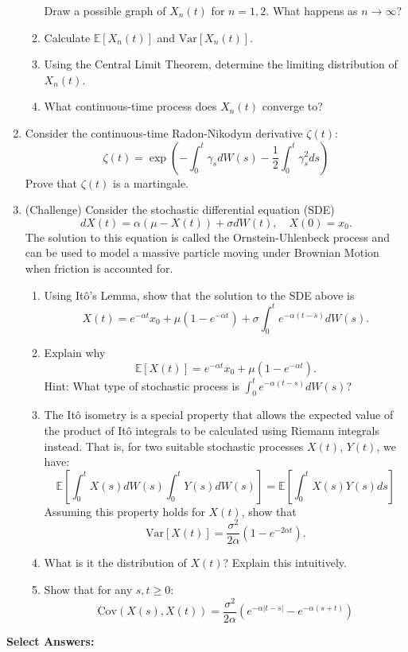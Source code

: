 \documentclass[11pt]{article}
\newcommand{\E}{\mathbb{E}}
\begin{document}
\begin{enumerate}
\begin{enumerate}
				Draw a possible graph of $X_{n}(t)$ for $n=1,2$. What happens as $n\to\infty$?
				\item Calculate $\E[X_{n}(t)]$ and $\text{Var}[X_{n}(t)]$.
				\item Using the Central Limit Theorem, determine the limiting distribution of $X_{n}(t)$.
				\item What continuous-time process does $X_{n}(t)$ converge to?
			\end{enumerate}
		\item Consider the continuous-time Radon-Nikodym derivative $\zeta(t)$:
		\[	\zeta(t) = \exp\left(-\int_{0}^{t}\gamma_{s}dW(s) -\frac{1}{2} \int_{0}^{t}\gamma_{s}^{2}ds\right)
			\]
		Prove that $\zeta(t)$ is a martingale.
		\item (Challenge) Consider the stochastic differential equation (SDE)
		\[	dX(t) = \alpha(\mu - X(t))+ \sigma dW(t),\quad X(0) = x_{0}.
		\]
		The solution to this equation is called the Ornstein-Uhlenbeck process and can be used to model a massive particle moving under Brownian Motion when friction is accounted for.
		\begin{enumerate}
			\item Using It\^{o}'s Lemma, show that the solution to the SDE above 
			is 
			\[	X(t) = e^{-\alpha t}x_{0} + \mu(1 - e^{-\alpha t}) + \sigma\int_{0}^{t}e^{-\alpha(t - s)}dW(s).
			\]
			\item Explain why 
			\[	\E[X(t)] = e^{-\alpha t}x_{0} + \mu(1 - e^{-\alpha t}).
				\]
			Hint: What type of stochastic process is $\int_{0}^{t}e^{-\alpha(t - s)}dW(s)$?
			\item The It\^{o} isometry is a special property that allows the expected value of the product of It\^{o} integrals to be calculated using Riemann integrals instead. That is, for two suitable stochastic processes $X(t)$, $Y(t)$, we have:
			\[	\E\left[\int_{0}^{t}X(s)dW(s)\int_{0}^{t}Y(s)dW(s)\right]
				 = \E\left[\int_{0}^{t}X(s)Y(s)ds\right]
				\]
			Assuming this property holds for $X(t)$, show that
			\[	\text{Var}[X(t)] = \frac{\sigma^{2}}{2\alpha}(1 - e^{-2\alpha t}).
				\]
			\item What is it the distribution of $X(t)$? Explain this intuitively.
			\item Show that for any $s, t\geq 0$:
			\[	\text{Cov}(X(s), X(t)) = \frac{\sigma^{2}}{2\alpha}(e^{-\alpha|t - s|} - e^{-\alpha(s + t)})
				\]
		\end{enumerate}
	\end{enumerate}
	\textbf{Select Answers:}\\
\end{document}
